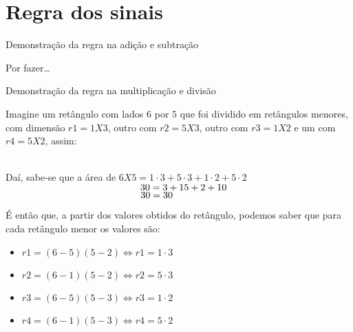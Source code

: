 \section{Regra dos sinais}
Demonstração da regra na adição e subtração

Por fazer\dots

\noindent Demonstração da regra na multiplicação e divisão

Imagine um retângulo com lados $6$ por $5$ que foi dividido em retângulos menores, com dimensão $ r1 = 1 X 3 $, outro com $ r2 = 5 X 3 $, outro com $ r3 = 1 X 2 $ e um com $ r4 = 5 X 2 $, assim: \\

 \\

 Daí, sabe-se que a área de $ 6 X 5 = 1 \cdot 3 + 5 \cdot 3 + 1 \cdot 2 + 5 \cdot 2 $ \\
 $ \indent \indent \indent \indent \indent \indent \indent \indent \indent \; \: 30 = 3+15+2+10 $ \\
 $ \indent \indent \indent \indent \indent \indent \indent \indent \indent \; \: 30 = 30 $

 É então que, a partir dos valores obtidos do retângulo, podemos saber que para cada retângulo menor os valores são:

\begin{itemize}
	\item $ r1 = (6-5)(5-2) \Leftrightarrow r1 = 1 \cdot 3 $
	\item $ r2 = (6-1)(5-2) \Leftrightarrow r2 = 5 \cdot 3 $
	\item $ r3 = (6-5)(5-3) \Leftrightarrow r3 = 1 \cdot 2 $
	\item $ r4 = (6-1)(5-3) \Leftrightarrow r4 = 5 \cdot 2 $
\end{itemize}


